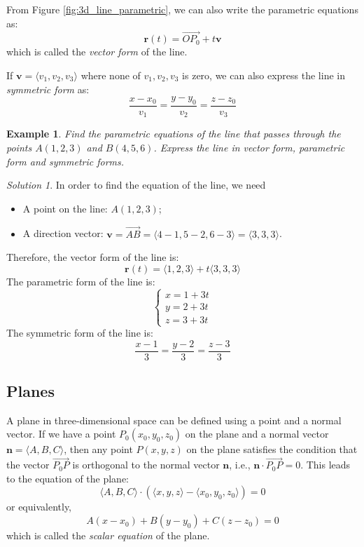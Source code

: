 \documentclass{book}
\newtheorem{example}{Example}[chapter]
\theoremstyle{remark}
\newtheorem*{solution}{Solution}
\begin{document}
From Figure \ref{fig:3d_line_parametric}, we can also write the parametric equations as:
\[
    \mathbf{r}(t) = \overrightarrow{OP_0} + t\mathbf{v}
\]
which is called the \emph{vector form} of the line.

If $\mathbf{v} = \langle v_1, v_2, v_3 \rangle$ where none of $v_1, v_2, v_3$ is zero, we can also express the line in \emph{symmetric form} as:
\[
    \frac{x - x_0}{v_1} = \frac{y - y_0}{v_2} = \frac{z - z_0}{v_3}
\]

\begin{example}
    Find the parametric equations of the line that passes through the points $A(1, 2, 3)$ and $B(4, 5, 6)$. Express the line in vector form, parametric form and symmetric forms.
\end{example}
\begin{solution}
    In order to find the equation of the line, we need 
    \begin{itemize}
        \item A point on the line: $A(1, 2, 3)$;
        \item A direction vector: $\mathbf{v} = \overrightarrow{AB} = \langle 4 - 1, 5 - 2, 6 - 3 \rangle = \langle 3, 3, 3 \rangle$.
    \end{itemize}
    Therefore, the vector form of the line is:
    \[
        \mathbf{r}(t) = \langle 1, 2, 3 \rangle + t \langle 3, 3, 3 \rangle
    \]
    The parametric form of the line is:
    \[
        \begin{cases}
            x = 1 + 3t \\
            y = 2 + 3t \\
            z = 3 + 3t
        \end{cases}
    \]
    The symmetric form of the line is:
    \[
        \frac{x - 1}{3} = \frac{y - 2}{3} = \frac{z - 3}{3}
    \]
\end{solution}

\subsection{Planes}

A plane in three-dimensional space can be defined using a point and a normal vector. If we have a point $P_0(x_0, y_0, z_0)$ on the plane and a normal vector $\mathbf{n} = \langle A, B, C \rangle$, then any point $P(x, y, z)$ on the plane satisfies the condition that the vector $\overrightarrow{P_0P}$ is orthogonal to the normal vector $\mathbf{n}$, i.e., $\mathbf{n} \cdot \overrightarrow{P_0P} = 0$. This leads to the equation of the plane:
\[
    \langle A, B, C \rangle \cdot (\langle x, y, z \rangle - \langle x_0, y_0, z_0 \rangle) = 0
\]
or equivalently,
\[
    A(x - x_0) + B(y - y_0) + C(z - z_0) = 0
\]
which is called the \emph{scalar equation} of the plane. 
\end{document}
